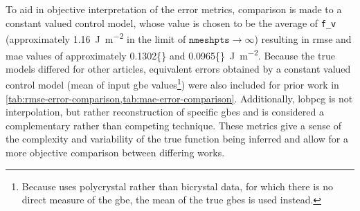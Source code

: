 \documentclass[final,twocolumn,12pt]{elsarticle}
\newcommand{\inpt}{input}
\newcommand{\inptvar}{nmeshpts}
\newcommand{\avgrmse}{0.1302}
\newcommand{\avgmae}{0.0965}
\begin{document}

To aid in objective interpretation of the error metrics, comparison is made to a constant valued control model, whose value is chosen to be the average of \texttt{f\_v} (approximately \SI{1.16}{\J\per\square\meter} in the limit of $\texttt{\inptvar{}} \rightarrow \infty$) resulting in \gls{rmse} and \gls{mae} values of approximately \num{\avgrmse{}} and \SI{\avgmae{}}{\J\per\square\meter}. Because the true models differed for other articles, equivalent errors obtained by a constant valued control model (mean of \inpt{} \gls{gbe} values\footnote{Because \cite{shenDeterminingGrainBoundary2019} uses polycrystal rather than bicrystal data, for which there is no direct measure of the \gls{gbe}, the mean of the true \glspl{gbe} is used instead.}) were also included for prior work in \cref{tab:rmse-error-comparison,tab:mae-error-comparison}. Additionally, \gls{lobpcg} is not interpolation, but rather reconstruction of specific \glspl{gbe} and is considered a complementary rather than competing technique. These metrics give a sense of the complexity and variability of the true function being inferred and allow for a more objective comparison between differing works.
\end{document}
